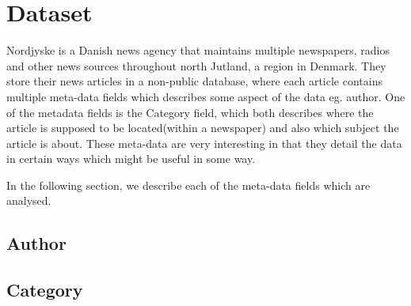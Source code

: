 \section{Dataset}
Nordjyske is a Danish news agency that maintains multiple newspapers, radios and other news sources throughout north Jutland, a region in Denmark.
They store their news articles in a non-public database, where each article contains multiple meta-data fields which describes some aspect of the data eg. author.
One of the metadata fields is the Category field, which both describes where the article is supposed to be located(within a newspaper) and also which subject the article is about.
These meta-data are very interesting in that they detail the data in certain ways which might be useful in some way.

In the following section, we describe each of the meta-data fields which are analysed.
\subsection{Author}


\subsection{Category}